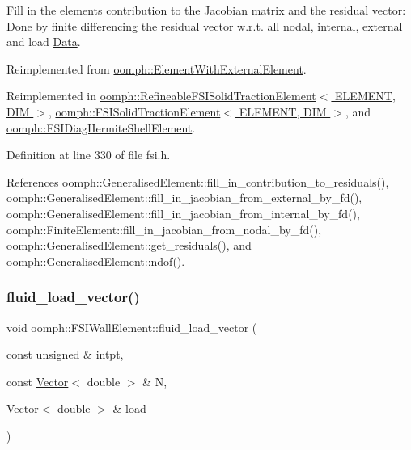 Fill in the element\textquotesingle{}s contribution to the Jacobian matrix and the residual vector\+: Done by finite differencing the residual vector w.\+r.\+t. all nodal, internal, external and load \hyperlink{classoomph_1_1Data}{Data}. 

Reimplemented from \hyperlink{classoomph_1_1ElementWithExternalElement_ae5fb09552a8271e891438f8d058ca1b8}{oomph\+::\+Element\+With\+External\+Element}.



Reimplemented in \hyperlink{classoomph_1_1RefineableFSISolidTractionElement_a886a6bcb5722c9535f6f78ccefdc0646}{oomph\+::\+Refineable\+F\+S\+I\+Solid\+Traction\+Element$<$ E\+L\+E\+M\+E\+N\+T, D\+I\+M $>$}, \hyperlink{classoomph_1_1FSISolidTractionElement_a789bdb99ca30e3c7b56adab5be79a59d}{oomph\+::\+F\+S\+I\+Solid\+Traction\+Element$<$ E\+L\+E\+M\+E\+N\+T, D\+I\+M $>$}, and \hyperlink{classoomph_1_1FSIDiagHermiteShellElement_a5e48d1c0291cf16cacaa8b42112efe90}{oomph\+::\+F\+S\+I\+Diag\+Hermite\+Shell\+Element}.



Definition at line 330 of file fsi.\+h.



References oomph\+::\+Generalised\+Element\+::fill\+\_\+in\+\_\+contribution\+\_\+to\+\_\+residuals(), oomph\+::\+Generalised\+Element\+::fill\+\_\+in\+\_\+jacobian\+\_\+from\+\_\+external\+\_\+by\+\_\+fd(), oomph\+::\+Generalised\+Element\+::fill\+\_\+in\+\_\+jacobian\+\_\+from\+\_\+internal\+\_\+by\+\_\+fd(), oomph\+::\+Finite\+Element\+::fill\+\_\+in\+\_\+jacobian\+\_\+from\+\_\+nodal\+\_\+by\+\_\+fd(), oomph\+::\+Generalised\+Element\+::get\+\_\+residuals(), and oomph\+::\+Generalised\+Element\+::ndof().

\mbox{\label{classoomph_1_1FSIWallElement_a4b6eacec41f41006a3884ee0dbda3bcb}} 
\subsubsection{\texorpdfstring{fluid\+\_\+load\+\_\+vector()}{fluid\_load\_vector()}}
{\footnotesize\ttfamily void oomph\+::\+F\+S\+I\+Wall\+Element\+::fluid\+\_\+load\+\_\+vector (\begin{DoxyParamCaption}\item[{const unsigned \&}]{intpt,  }\item[{const \hyperlink{classoomph_1_1Vector}{Vector}$<$ double $>$ \&}]{N,  }\item[{\hyperlink{classoomph_1_1Vector}{Vector}$<$ double $>$ \&}]{load }\end{DoxyParamCaption})\hspace{0.3cm}{\ttfamily [protected]}}



